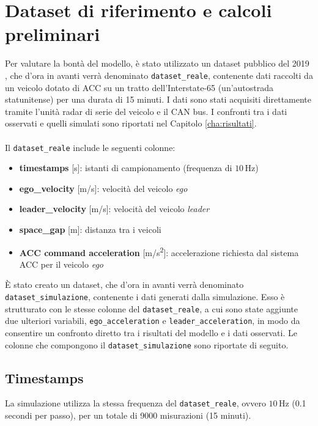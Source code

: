 \section{Dataset di riferimento e calcoli preliminari}
Per valutare la bontà del modello, è stato utilizzato un dataset pubblico del 2019 \cite{wang2019acc_dataset}, che d'ora in avanti
verrà denominato \texttt{dataset\_reale}, contenente dati raccolti da un veicolo dotato di ACC su un tratto dell'Interstate-65 
(un'autostrada statunitense) per una durata di 15 minuti.  
I dati sono stati acquisiti direttamente tramite l'unità radar di serie del veicolo e il CAN bus.  
I confronti tra i dati osservati e quelli simulati sono riportati nel Capitolo \ref{cha:risultati}.
\\\\
\noindent Il \texttt{dataset\_reale} include le seguenti colonne:
\begin{itemize}
    \item \textbf{timestamps} [s]: istanti di campionamento (frequenza di $10\,\mathrm{Hz}$)
    \item \textbf{ego\_velocity} [m/s]: velocità del veicolo \emph{ego}
    \item \textbf{leader\_velocity} [m/s]: velocità del veicolo \emph{leader}
    \item \textbf{space\_gap} [m]: distanza tra i veicoli
    \item \textbf{ACC command acceleration} [m/s\textsuperscript{2}]: accelerazione richiesta dal sistema ACC per il veicolo \emph{ego}
\end{itemize}

\noindent È stato creato un dataset, che d'ora in avanti verrà denominato \texttt{dataset\_simulazione}, 
contenente i dati generati dalla simulazione.  
Esso è strutturato con le stesse colonne del \texttt{dataset\_reale}, a cui sono state aggiunte due ulteriori variabili, 
\texttt{ego\_acceleration} e \texttt{leader\_acceleration}, 
in modo da consentire un confronto diretto tra i risultati del modello e i dati osservati.  
Le colonne che compongono il \texttt{dataset\_simulazione} sono riportate di seguito.



\subsection{Timestamps}
La simulazione utilizza la stessa frequenza del \texttt{dataset\_reale}, 
ovvero $10\,\mathrm{Hz}$ (0.1 secondi per passo), per un totale di 9000 misurazioni (15 minuti).

